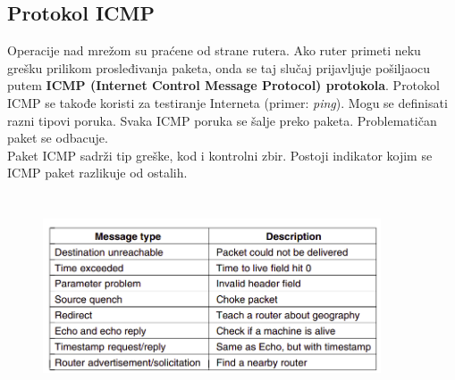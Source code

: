 \documentclass[a4paper]{article}
\begin{document}
    \subsection{Protokol ICMP}
        Operacije nad mrežom su praćene od strane rutera. Ako ruter primeti neku grešku prilikom
        prosleđivanja paketa, onda se taj slučaj prijavljuje pošiljaocu putem \textbf{ICMP (Internet 
        Control Message Protocol) protokola}. Protokol ICMP se takođe koristi za testiranje Interneta
        (primer: \textit{ping}). 
        Mogu se definisati razni tipovi poruka. Svaka ICMP poruka se šalje preko paketa. Problematičan
        paket se odbacuje. \\
        \indent Paket ICMP sadrži tip greške, kod i kontrolni zbir. Postoji indikator kojim
        se ICMP paket razlikuje od ostalih.  
        \begin{figure}[H]
            \begin{center}
                \includegraphics[width=100mm,height=60mm]{Slike/icmp_tipovi.png}
            \end{center}
        \end{figure}

    \newpage
\end{document}
